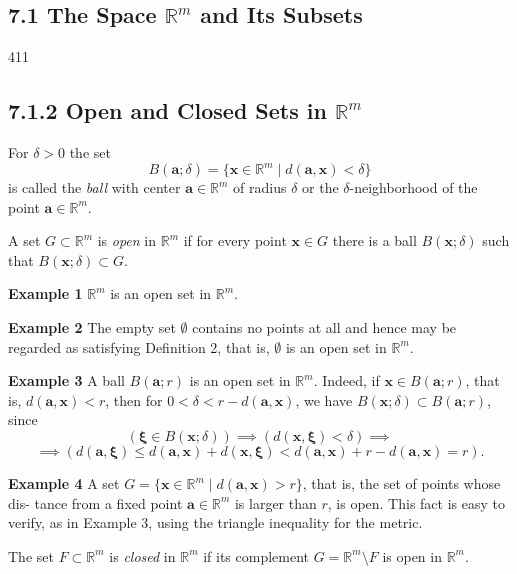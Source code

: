 \subsection{7.1 The Space $\mathbb{R}^m$ and Its Subsets}
\hfill 411
\subsection{7.1.2 Open and Closed Sets in $\mathbb{R}^m$}
\begin{definition} \label{def:ball} For $\delta > 0$ the set
$$
B(\mathbf{a}; \delta) = \{\mathbf{x} \in \mathbb{R}^m \mid d(\mathbf{a}, \mathbf{x}) < \delta\}
$$
is called the \emph{ball} with center $\mathbf{a} \in \mathbb{R}^m$ of radius $\delta$ or the $\delta$-neighborhood of the point
$\mathbf{a} \in \mathbb{R}^m$.
\end{definition}

\begin{definition} \label{def:open} A set $G \subset \mathbb{R}^m$ is \emph{open} in $\mathbb{R}^m$ if for every point $\mathbf{x} \in G$ there is a ball
$B(\mathbf{x}; \delta)$ such that $B(\mathbf{x}; \delta) \subset G$.
\end{definition}

\textbf{Example 1} $\mathbb{R}^m$ is an open set in $\mathbb{R}^m$.

\textbf{Example 2} The empty set $\emptyset$ contains no points at all and hence may be regarded as
satisfying Definition 2, that is, $\emptyset$ is an open set in $\mathbb{R}^m$.

\textbf{Example 3} A ball $B(\mathbf{a}; r)$ is an open set in $\mathbb{R}^m$. Indeed, if $\mathbf{x} \in B(\mathbf{a}; r)$, that is,
$d(\mathbf{a}, \mathbf{x}) < r$, then for $0 < \delta < r - d(\mathbf{a}, \mathbf{x})$, we have $B(\mathbf{x}; \delta) \subset B(\mathbf{a}; r)$, since
$$
(\mathbf{\xi} \in B(\mathbf{x}; \delta)) \implies (d(\mathbf{x}, \mathbf{\xi}) < \delta) \implies
$$
$$
\implies (d(\mathbf{a},\mathbf{\xi}) \le d(\mathbf{a}, \mathbf{x}) + d(\mathbf{x}, \mathbf{\xi}) < d(\mathbf{a}, \mathbf{x}) + r - d(\mathbf{a}, \mathbf{x}) =r).
$$

\textbf{Example 4} A set $G = \{\mathbf{x} \in \mathbb{R}^m \mid d(\mathbf{a}, \mathbf{x}) > r\}$, that is, the set of points whose dis-
tance from a fixed point $\mathbf{a} \in \mathbb{R}^m$ is larger than $r$, is open. This fact is easy to verify,
as in Example 3, using the triangle inequality for the metric.

\begin{definition} \label{def:closed} The set $F \subset \mathbb{R}^m$ is \emph{closed} in $\mathbb{R}^m$ if its complement $G = \mathbb{R}^m \setminus F$ is open
in $\mathbb{R}^m$.
\end{definition}

